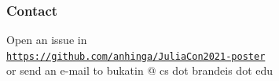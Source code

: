 \documentclass{beamer}
\begin{document}
\begin{frame}

\frametitle{Contact}

Open an issue in\\[2ex]

\href{https://github.com/anhinga/JuliaCon2021-poster}{\tt https://github.com/anhinga/JuliaCon2021-poster}\\[2ex]


or send an e-mail to bukatin @ cs dot brandeis dot edu



\end{frame}
\end{document}
